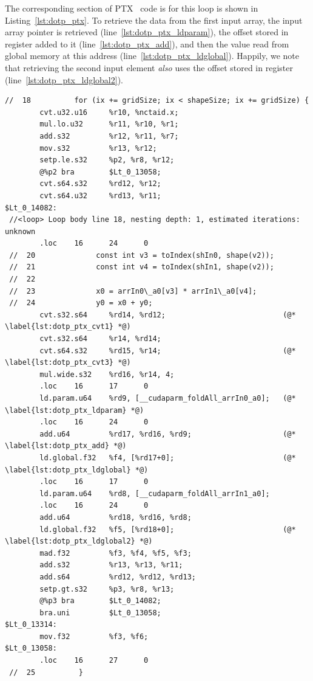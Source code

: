 The corresponding section of PTX~\cite{NVIDIA:2012vj} code is for this loop is
shown in Listing~\ref{lst:dotp_ptx}. To retrieve the data from the first input
array, the input array pointer is retrieved (line~\ref{lst:dotp_ptx_ldparam}),
the offset stored in register  added to it
(line~\ref{lst:dotp_ptx_add}), and then the value read from global memory at
this address (line~\ref{lst:dotp_ptx_ldglobal}). Happily, we note that
retrieving the second input element \emph{also} uses the offset stored in
register  (line~\ref{lst:dotp_ptx_ldglobal2}).
%
\begin{lstlisting}[style=ptx
    ,float
    ,firstnumber=103
    ,label=lst:dotp_ptx
    ,caption={[Corresponding PTX code for the first step of fused dot product]
        Corresponding PTX code for the first step of fused dot product (sm13)}]
 //  18          for (ix += gridSize; ix < shapeSize; ix += gridSize) {
        cvt.u32.u16     %r10, %nctaid.x;
        mul.lo.u32      %r11, %r10, %r1;
        add.s32         %r12, %r11, %r7;
        mov.s32         %r13, %r12;
        setp.le.s32     %p2, %r8, %r12;
        @%p2 bra        $Lt_0_13058;
        cvt.s64.s32     %rd12, %r12;
        cvt.s64.u32     %rd13, %r11;
$Lt_0_14082:
 //<loop> Loop body line 18, nesting depth: 1, estimated iterations: unknown
        .loc    16      24      0
 //  20              const int v3 = toIndex(shIn0, shape(v2));
 //  21              const int v4 = toIndex(shIn1, shape(v2));
 //  22
 //  23              x0 = arrIn0\_a0[v3] * arrIn1\_a0[v4];
 //  24              y0 = x0 + y0;
        cvt.s32.s64     %rd14, %rd12;                           (@* \label{lst:dotp_ptx_cvt1} *@)
        cvt.s32.s64     %r14, %rd14;
        cvt.s64.s32     %rd15, %r14;                            (@* \label{lst:dotp_ptx_cvt3} *@)
        mul.wide.s32    %rd16, %r14, 4;
        .loc    16      17      0
        ld.param.u64    %rd9, [__cudaparm_foldAll_arrIn0_a0];   (@* \label{lst:dotp_ptx_ldparam} *@)
        .loc    16      24      0
        add.u64         %rd17, %rd16, %rd9;                     (@* \label{lst:dotp_ptx_add} *@)
        ld.global.f32   %f4, [%rd17+0];                         (@* \label{lst:dotp_ptx_ldglobal} *@)
        .loc    16      17      0
        ld.param.u64    %rd8, [__cudaparm_foldAll_arrIn1_a0];
        .loc    16      24      0
        add.u64         %rd18, %rd16, %rd8;
        ld.global.f32   %f5, [%rd18+0];                         (@* \label{lst:dotp_ptx_ldglobal2} *@)
        mad.f32         %f3, %f4, %f5, %f3;
        add.s32         %r13, %r13, %r11;
        add.s64         %rd12, %rd12, %rd13;
        setp.gt.s32     %p3, %r8, %r13;
        @%p3 bra        $Lt_0_14082;
        bra.uni         $Lt_0_13058;
$Lt_0_13314:
        mov.f32         %f3, %f6;
$Lt_0_13058:
        .loc    16      27      0
 //  25          }
\end{lstlisting}


